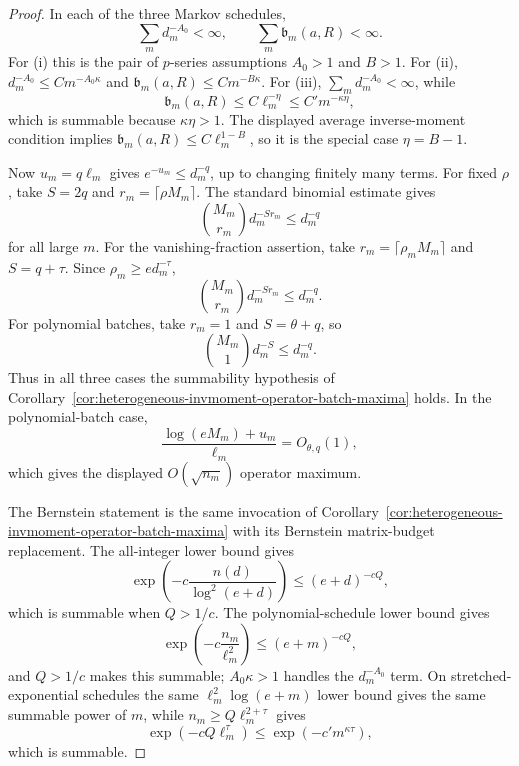 \documentclass[11pt]{amsart}
\numberwithin{equation}{section}
\theoremstyle{definition}
\theoremstyle{remark}
\begin{document}
\begin{proof}
In each of the three Markov schedules,
\[
  \sum_m d_m^{-A_0}<\infty,
  \qquad
  \sum_m\mathfrak b_m(a,R)<\infty .
\]
For \textup{(i)} this is the pair of \(p\)-series assumptions \(A_0>1\) and
\(B>1\).  For \textup{(ii)}, \(d_m^{-A_0}\le C m^{-A_0\kappa}\) and
\(\mathfrak b_m(a,R)\le C m^{-B\kappa}\).  For \textup{(iii)},
\(\sum_m d_m^{-A_0}<\infty\), while
\[
  \mathfrak b_m(a,R)\le C\ell_m^{-\eta}
  \le C' m^{-\kappa\eta},
\]
which is summable because \(\kappa\eta>1\).  The displayed average
inverse-moment condition implies \(\mathfrak b_m(a,R)\le C\ell_m^{1-B}\), so it
is the special case \(\eta=B-1\).

Now \(u_m=q\ell_m\) gives \(e^{-u_m}\le d_m^{-q}\), up to changing finitely many
terms.  For fixed \(\rho\), take \(S=2q\) and
\(r_m=\lceil\rho M_m\rceil\).  The standard binomial estimate gives
\[
  \binom{M_m}{r_m}d_m^{-S r_m}
  \le d_m^{-q}
\]
for all large \(m\).  For the vanishing-fraction assertion, take
\(r_m=\lceil\rho_mM_m\rceil\) and \(S=q+\tau\).  Since
\(\rho_m\ge e d_m^{-\tau}\),
\[
  \binom{M_m}{r_m}d_m^{-S r_m}
  \le d_m^{-q}.
\]
For polynomial batches, take \(r_m=1\) and \(S=\theta+q\), so
\[
  \binom{M_m}{1}d_m^{-S}\le d_m^{-q}.
\]
Thus in all three cases the summability hypothesis of
Corollary~\ref{cor:heterogeneous-invmoment-operator-batch-maxima} holds.  In the
polynomial-batch case,
\[
  \frac{\log(eM_m)+u_m}{\ell_m}=O_{\theta,q}(1),
\]
which gives the displayed \(O(\sqrt{n_m})\) operator maximum.

The Bernstein statement is the same invocation of
Corollary~\ref{cor:heterogeneous-invmoment-operator-batch-maxima} with its
Bernstein matrix-budget replacement.  The all-integer lower bound gives
\[
  \exp\left(-c\frac{n(d)}{\log^2(e+d)}\right)
  \le (e+d)^{-cQ},
\]
which is summable when \(Q>1/c\).  The polynomial-schedule lower bound gives
\[
  \exp\left(-c\frac{n_m}{\ell_m^2}\right)
  \le (e+m)^{-cQ},
\]
and \(Q>1/c\) makes this summable; \(A_0\kappa>1\) handles the
\(d_m^{-A_0}\) term.  On stretched-exponential schedules the same
\(\ell_m^2\log(e+m)\) lower bound gives the same summable power of \(m\), while
\(n_m\ge Q\ell_m^{2+\tau}\) gives
\[
  \exp\left(-cQ\ell_m^\tau\right)\le \exp(-c'm^{\kappa\tau}),
\]
which is summable.
\end{proof}
\end{document}

